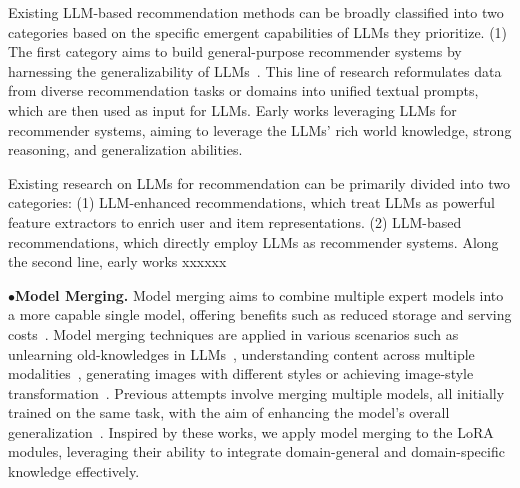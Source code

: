 Existing LLM-based recommendation methods can be broadly classified into two categories based on the specific emergent capabilities of LLMs they prioritize. (1) The first category aims to build general-purpose recommender systems by harnessing the generalizability of LLMs~\cite{10.1145/3705727,geng2022recommendation,10.1145/3708882,peng2024ecellm,dai2023uncovering}.
This line of research reformulates data from diverse recommendation tasks or domains into unified textual prompts, which are then used as input for LLMs.
Early works leveraging LLMs for recommender systems, aiming to leverage the LLMs' rich world knowledge, strong reasoning, and generalization abilities.





Existing research on LLMs for recommendation can be primarily divided into two categories: (1) LLM-enhanced recommendations, which treat LLMs as powerful feature extractors to enrich user and item representations. (2) LLM-based recommendations, which directly employ LLMs as recommender systems. Along the second line, early works xxxxxx
\fi


\noindent$\bullet$\quad\textbf{Model Merging.}
Model merging aims to combine multiple expert models into a more capable single model, offering benefits such as reduced storage and serving costs~\cite{yang2024modelmergingllmsmllms}.
Model merging techniques are applied in various scenarios such as unlearning old-knowledges in LLMs~\cite{zaman-etal-2024-fuse}, understanding content across multiple modalities~\cite{aiello2024jointly,chen-etal-2024-model}, generating images with different styles or achieving image-style transformation~\cite{biggs2024diffusion}.
Previous attempts involve merging multiple models, all initially trained on the same task, with the aim of enhancing the model’s overall generalization~\cite{Gupta2020Stochastic,wang2022meta}. 
Inspired by these works, we apply model merging to the LoRA modules, leveraging their ability to integrate domain-general and domain-specific knowledge effectively.
